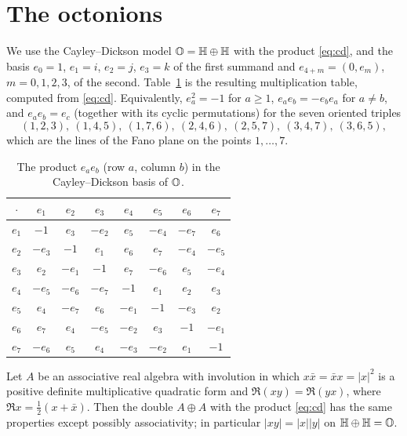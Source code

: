 \section{The octonions}\label{app:octonions}

We use the Cayley--Dickson model $\mathbb{O}=\mathbb{H}\oplus\mathbb{H}$ with the product \eqref{eq:cd}, and the basis $e_0=1$, $e_1=i$, $e_2=j$, $e_3=k$ of the first summand and $e_{4+m}=(0,e_m)$, $m=0,1,2,3$, of the second. Table~\ref{tab:octonions} is the resulting multiplication table, computed from \eqref{eq:cd}. Equivalently, $e_a^2=-1$ for $a\ge1$, $e_ae_b=-e_be_a$ for $a\neq b$, and $e_ae_b=e_c$ (together with its cyclic permutations) for the seven oriented triples
\[
(1,2,3),\ (1,4,5),\ (1,7,6),\ (2,4,6),\ (2,5,7),\ (3,4,7),\ (3,6,5),
\]
which are the lines of the Fano plane on the points $1,\dots,7$.

\begin{table}[ht]
\centering
\small
\begin{tabular}{@{}c|ccccccc@{}}
\toprule
$\cdot$ & $e_1$ & $e_2$ & $e_3$ & $e_4$ & $e_5$ & $e_6$ & $e_7$\\
\midrule
$e_1$ & $-1$ & $e_3$ & $-e_2$ & $e_5$ & $-e_4$ & $-e_7$ & $e_6$\\
$e_2$ & $-e_3$ & $-1$ & $e_1$ & $e_6$ & $e_7$ & $-e_4$ & $-e_5$\\
$e_3$ & $e_2$ & $-e_1$ & $-1$ & $e_7$ & $-e_6$ & $e_5$ & $-e_4$\\
$e_4$ & $-e_5$ & $-e_6$ & $-e_7$ & $-1$ & $e_1$ & $e_2$ & $e_3$\\
$e_5$ & $e_4$ & $-e_7$ & $e_6$ & $-e_1$ & $-1$ & $-e_3$ & $e_2$\\
$e_6$ & $e_7$ & $e_4$ & $-e_5$ & $-e_2$ & $e_3$ & $-1$ & $-e_1$\\
$e_7$ & $-e_6$ & $e_5$ & $e_4$ & $-e_3$ & $-e_2$ & $e_1$ & $-1$\\
\bottomrule
\end{tabular}
\caption{The product $e_ae_b$ (row $a$, column $b$) in the Cayley--Dickson basis of $\mathbb{O}$.}
\label{tab:octonions}
\end{table}

\begin{proposition}\label{prop:composition-norm}
Let $A$ be an associative real algebra with involution in which $x\bar x=\bar xx=|x|^2$ is a positive definite multiplicative quadratic form and $\Re(xy)=\Re(yx)$, where $\Re x=\frac12(x+\bar x)$. Then the double $A\oplus A$ with the product \eqref{eq:cd} has the same properties except possibly associativity; in particular $|xy|=|x||y|$ on $\mathbb{H}\oplus\mathbb{H}=\mathbb{O}$.
\end{proposition}

